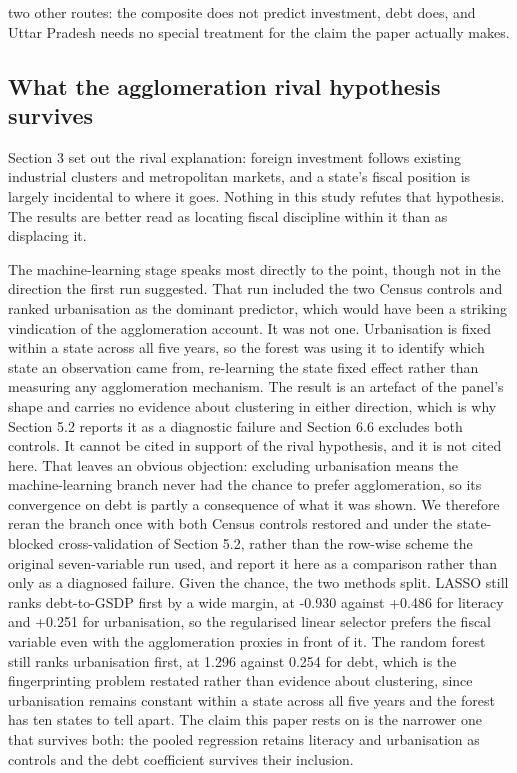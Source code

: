 \documentclass[12pt,a4paper]{article}
\begin{document}
two other routes: the composite does not predict investment, debt does, and Uttar Pradesh needs no special treatment for the claim the paper actually makes.

\subsection{What the agglomeration rival hypothesis survives}

Section 3 set out the rival explanation: foreign investment follows existing industrial clusters and metropolitan markets, and a state's fiscal position is largely incidental to where it goes. Nothing in this study refutes that hypothesis. The results are better read as locating fiscal discipline within it than as displacing it.

The machine-learning stage speaks most directly to the point, though not in the direction the first run suggested. That run included the two Census controls and ranked urbanisation as the dominant predictor, which would have been a striking vindication of the agglomeration account. It was not one. Urbanisation is fixed within a state across all five years, so the forest was using it to identify which state an observation came from, re-learning the state fixed effect rather than measuring any agglomeration mechanism. The result is an artefact of the panel's shape and carries no evidence about clustering in either direction, which is why Section 5.2 reports it as a diagnostic failure and Section 6.6 excludes both controls. It cannot be cited in support of the rival hypothesis, and it is not cited here. That leaves an obvious objection: excluding urbanisation means the machine-learning branch never had the chance to prefer agglomeration, so its convergence on debt is partly a consequence of what it was shown. We therefore reran the branch once with both Census controls restored and under the state-blocked cross-validation of Section 5.2, rather than the row-wise scheme the original seven-variable run used, and report it here as a comparison rather than only as a diagnosed failure. Given the chance, the two methods split. LASSO still ranks debt-to-GSDP first by a wide margin, at -0.930 against +0.486 for literacy and +0.251 for urbanisation, so the regularised linear selector prefers the fiscal variable even with the agglomeration proxies in front of it. The random forest still ranks urbanisation first, at 1.296 against 0.254 for debt, which is the fingerprinting problem restated rather than evidence about clustering, since urbanisation remains constant within a state across all five years and the forest has ten states to tell apart. The claim this paper rests on is the narrower one that survives both: the pooled regression retains literacy and urbanisation as controls and the debt coefficient survives their inclusion.
\end{document}
